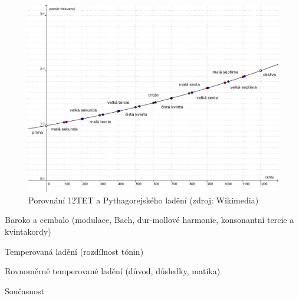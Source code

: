\documentclass[12pt]{article}
\begin{document}
\begin{figure}[p]\centering
	\includegraphics[width = \textwidth]{et_pyth_comparison.pdf}
	\caption{Porovnání 12TET a Pythagorejského ladění (zdroj: Wikimedia)}
	\label{fig:et_pyth_comparison}
\end{figure}

\pagebreak

Baroko a cembalo (modulace, Bach, dur-mollové harmonie, konsonantní tercie a kvintakordy)

Temperovaná ladění (rozdílnost tónin)

Rovnoměrně temperované ladění (důvod, důsledky, matika)

Současnost


{}

\end{document}
